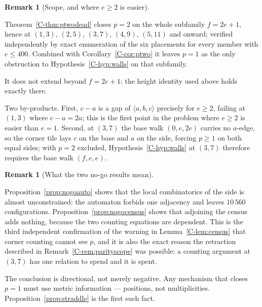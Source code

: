 \documentclass[11pt,reqno]{amsart}
\theoremstyle{plain}
\theoremstyle{definition}
\newtheorem{remark}[theorem]{Remark}
\begin{document}
\begin{remark}[Scope, and where $e\ge2$ is easier]\label{O-ptwoscopeb}

Theorem~\ref{C-thm:ptwodead} closes $p=2$ on the whole subfamily $f=2e+1$, hence at $(1,3)$, $(2,5)$,
$(3,7)$, $(4,9)$, $(5,11)$ and onward; verified independently by exact enumeration of the six
placements for every member with $e\le400$. Combined with Corollary~\ref{C-cor:ptwo} it leaves $p=1$ as
the only obstruction to Hypothesis~\ref{C-hyp:walls} on that subfamily.

It does not extend beyond $f=2e+1$: the height identity used above holds exactly there.

Two by-products. First, $c-a$ is a gap of $\langle a,b,c\rangle$ precisely for $e\ge2$, failing at
$(1,3)$ where $c-a=2a$; this is the first point in the problem where $e\ge2$ is easier than $e=1$.
Second, at $(3,7)$ the base walk $(0,e,2e)$ carries no $a$-edge, so the corner tile lays $c$ on the
base and $a$ on the side, forcing $p\ge1$ on both equal sides; with $p=2$ excluded,
Hypothesis~\ref{C-hyp:walls} at $(3,7)$ therefore requires the base walk $(f,e,e)$.\end{remark}

\begin{remark}[What the two no-go results mean]\label{O-nogoscope}

Proposition~\ref{prop:nogoauto} shows that the local combinatorics of the side is almost unconstrained:
the automaton forbids one adjacency and leaves $10\,560$ configurations. Proposition~\ref{prop:nogocensus}
shows that adjoining the census adds nothing, because the two counting equations are dependent. This
is the third independent confirmation of the warning in Lemma~\ref{C-lem:census} that corner counting
cannot see $p$, and it is also the exact reason the retraction described in
Remark~\ref{C-rem:parityscope} was possible: a counting argument at $(3,7)$ has one relation to spend
and it is spent.

The conclusion is directional, not merely negative. Any mechanism that closes $p=1$ must use metric
information --- positions, not multiplicities. Proposition~\ref{prop:straddle} is the first such fact.
\end{remark}
\end{document}
